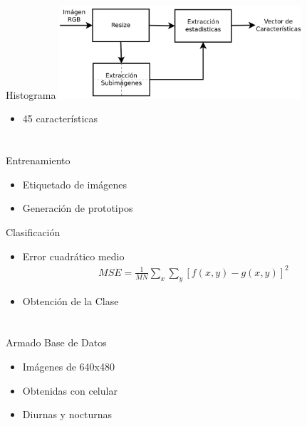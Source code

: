 \documentclass[spanish]{beamer}
\begin{document}
\begin{frame}{Histograma}
  \includegraphics[width=9cm]{../diagramas/procesoestadisticas}
  \begin{itemize}
  \item 45 características
  \end{itemize}
\end{frame}

\section[Métodos]{}

\begin{frame}{Entrenamiento}
  \begin{itemize}
  \item Etiquetado de imágenes
  \item Generación de prototipos
  \end{itemize}
\end{frame}

\begin{frame}{Clasificación}
  \begin{itemize}
  \item Error cuadrático medio
    \begin{align*}
      MSE = \frac{1}{MN} \sum_x\sum_y [ f(x,y) - g(x,y) ]^{2}
    \end{align*}
  \item Obtención de la Clase
  \end{itemize}
\end{frame}

\section[Pruebas]{}

\begin{frame}{Armado Base de Datos}
  \begin{itemize}
  \item Imágenes de 640x480
  \item Obtenidas con celular
  \item Diurnas y nocturnas
  \end{itemize}
\end{frame}
\end{document}
